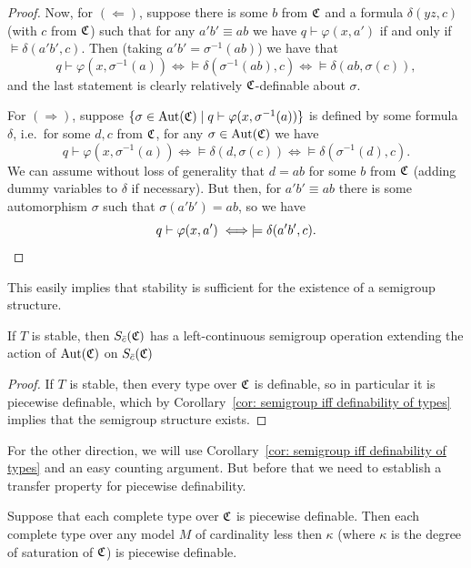 \begin{proof}
		Now, for $(\Leftarrow)$, suppose there is some $b$ from ${\mathfrak C}$ and a formula $\delta(yz,c)$ (with $c$ from ${\mathfrak C}$) such that for any $a'b'\equiv ab$ we have $q\vdash \varphi(x,a')$ if and only if $\models \delta(a'b',c)$. Then (taking $a'b'=\sigma^{-1}(ab)$) we have that
		\[
		q\vdash \varphi(x,\sigma^{-1}(a))\iff \models \delta(\sigma^{-1}(ab),c)\iff \models \delta(ab,\sigma(c)),
		\]
		and the last statement is clearly relatively ${\mathfrak C}$-definable about $\sigma$.
		
		For $(\Rightarrow)$, suppose $\{\sigma\in \operatorname{{Aut}}({\mathfrak C})\mid q\vdash \varphi(x,\sigma^{-1}(a))\}$ is defined by some formula $\delta$, i.e.\ for some $d,c$ from ${\mathfrak C}$, for any $\sigma \in \operatorname{{Aut}}({\mathfrak C})$ we have
		\[
		q\vdash \varphi(x,\sigma^{-1}(a))\iff \models\delta(d,\sigma(c)) \iff \models \delta(\sigma^{-1}(d),c).
		\]
		We can assume without loss of generality that $d=ab$ for some $b$ from ${\mathfrak C}$ (adding dummy variables to $\delta$ if necessary). But then, for $a'b'\equiv ab$ there is some automorphism $\sigma$ such that $\sigma(a'b')=ab$, so we have
		\[
		q\vdash \varphi(x,a')\iff \models \delta(a'b',c).\qedhere
		\]
	\end{proof}
	
	This easily implies that stability is sufficient for the existence of a semigroup structure.
	
	\begin{cor}\label{corollary: stability implies semigroup}
		If $T$ is stable, then $S_{\bar c}({\mathfrak C})$ has a left-continuous semigroup operation extending the action of $\operatorname{{Aut}}({\mathfrak C})$ on $S_{\bar c}({\mathfrak C})$
	\end{cor}
	\begin{proof}
		If $T$ is stable, then every type over ${\mathfrak C}$ is definable, so in particular it is piecewise definable, which by Corollary~\ref{cor: semigroup iff definability of types} implies that the semigroup structure exists.
	\end{proof}
	
	For the other direction, we will use Corollary~\ref{cor: semigroup iff definability of types} and an easy counting argument. But before that we need to establish a transfer property for piecewise definability.
	
	\begin{prop}\label{proposition: transfer of piecewise definability}
		Suppose that each complete type over ${\mathfrak C}$ is piecewise definable. Then each complete type over any model $M$ of cardinality less then $\kappa$ (where $\kappa$ is the degree of saturation of ${\mathfrak C}$) is piecewise definable.
	\end{prop}
	
